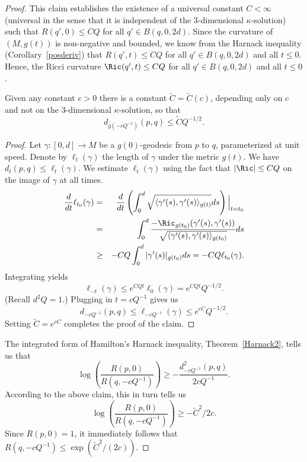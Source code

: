 \begin{proof}
This claim establishes the existence of a universal constant $C<\infty$
(universal in the sense that it is independent of the $3$-dimensional
$\kappa$-solution) such that $R(q',0)\le CQ$ for all $q'\in B(q,0,2d)$. Since
the curvature of $(M,g(t))$ is non-negative and bounded, we know from the
Harnack inequality (Corollary~\ref{posderiv}) that  $R(q',t)\le CQ$ for all
$q'\in B(q,0,2d)$ and all $t\le 0$. Hence, the Ricci curvature $\Ric(q',t)\le CQ$ for all $q'\in B(q,0,2d)$ and all $t\le 0$.

\begin{claim}\label{claim:distance-bound-under-rescaling}
Given any constant $c>0$ there is a constant $\widetilde
C=\widetilde C(c)$, depending only on $c$ and not on the
$3$-dimensional $\kappa$-solution, so that
$$d_{g(-cQ^{-1})}(p,q)\le \tilde CQ^{-1/2}.$$
\end{claim}

\begin{proof}
Let $\gamma\colon[0,d]\to M$ be a $g(0)$-geodesic from $p$ to $q$,
parameterized at unit speed. Denote by $\ell_t(\gamma)$ the length
of $\gamma$ under the metric $g(t)$. We have $d_t(p,q)\le
\ell_t(\gamma)$. We estimate $\ell_t(\gamma)$ using the fact that
$|\Ric|\le CQ$ on the image of $\gamma$ at all times.
\begin{eqnarray*}
\frac{d}{dt}\ell_{t_0}(\gamma) & = &
\frac{d}{dt}\left(\int_0^d\sqrt{\langle\gamma'(s),\gamma'(s)\rangle_{g(t)}}ds\right)
\Bigl|_{t=t_0}\Bigr.
\\
& = & \int_0^{d}\frac{-\Ric_{g(t_0)}(\gamma'(s),\gamma'(s))}
{\sqrt{\langle\gamma'(s),\gamma'(s)\rangle_{g(t_0)}}}ds \\
& \ge & -CQ\int_0^d|\gamma'(s)|_{g(t_0)}ds=-CQ\ell_{t_0}(\gamma).
\end{eqnarray*}
Integrating yields
$$\ell_{-t}(\gamma)\le e^{CQt}\ell_0(\gamma)=e^{CQt}Q^{-1/2}.$$
(Recall $d^2Q=1$.) Plugging in $t=cQ^{-1}$ gives us
$$d_{-cQ^{-1}}(p,q)\le \ell_{-cQ^{-1}}(\gamma)\le e^{cC}Q^{-1/2}.$$
Setting $\widetilde C=e^{cC}$ completes the proof of the claim.
\end{proof}

The integrated form of  Hamilton's Harnack inequality,
Theorem~\ref{Harnack2}, tells us that
$$\log\left(\frac{R(p,0)}{R(q,-cQ^{-1})}\right)\ge
-\frac{d_{-cQ^{-1}}^2(p,q)}{2cQ^{-1}}.$$ According to the above
claim, this in turn tells us
$$\log\left(\frac{R(p,0)}{R(q,-cQ^{-1})}\right)\ge -\widetilde
C^2/2c.$$ Since $R(p,0)=1$, it immediately follows that
$R(q,-cQ^{-1})\le \exp(\widetilde C^2/(2c))$.


\end{proof}
